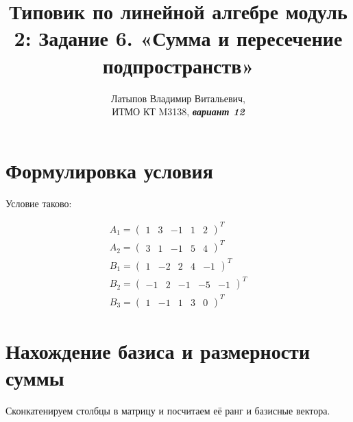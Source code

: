 \documentclass[12pt, a4paper]{article}
\author{Латыпов Владимир Витальевич, \\ ИТМО КТ M3138, \Huge{\textit{\textbf{вариант 12}}}}
\title{Типовик по линейной алгебре модуль 2: Задание 6. «Сумма и пересечение подпространств»}
\begin{document}
    \tit

    \section{Формулировка условия}

    \begin{statement}
        Условие таково: 

        \begin{gather}
            A_1 = \begin{pmatrix}
                1 & 3 & −1 & 1 & 2
            \end{pmatrix}^T \\ 
            A_2 = \begin{pmatrix}
                3 & 1 & −1 & 5 & 4
            \end{pmatrix}^T \\ 
            B_1 = \begin{pmatrix}
                1 & -2 & 2 & 4 & -1
            \end{pmatrix}^T \\ 
            B_2 = \begin{pmatrix}
                -1 & 2 & −1 & -5 & -1
            \end{pmatrix}^T \\ 
            B_3 = \begin{pmatrix}
                1 & -1 & 1 & 3 & 0
            \end{pmatrix}^T
        \end{gather}
    \end{statement}

    \section{Нахождение базиса и размерности суммы}

    Сконкатенируем столбцы в матрицу и посчитаем её ранг и базисные вектора.
\end{document}
